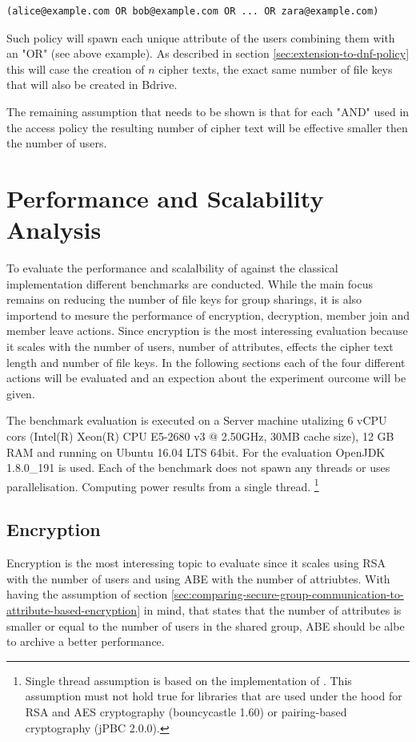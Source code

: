 \begin{center}
\begin{lstlisting}[caption={Worst case access policy. The used email address is a unique attribute per user.},captionpos=b]
(alice@example.com OR bob@example.com OR ... OR zara@example.com)
\end{lstlisting}
\end{center}

Such policy will spawn each unique attribute of the users combining them with an "OR" (see above example). As described in section \ref{sec:extension-to-dnf-policy} this will case the creation of $n$ cipher texts, the exact same number of file keys that will also be created in Bdrive. 

The remaining assumption that needs to be shown is that for each "AND" used in the access policy the resulting number of cipher text will be effective smaller then the number of users. 

\section{Performance and Scalability Analysis}

To evaluate the performance and scalalbility of \name against the classical implementation different benchmarks are conducted. While the main focus remains on reducing the number of file keys for group sharings, it is also importend to mesure the performance of encryption, decryption, member join and member leave actions. Since encryption is the most interessing evaluation because it scales with the number of users, number of attributes, effects the cipher text length and number of file keys. In the following sections each of the four different actions will be evaluated and an expection about the experiment ourcome will be given.

The benchmark evaluation is executed on a Server machine utalizing 6 vCPU cors (Intel(R) Xeon(R) CPU E5-2680 v3 @ 2.50GHz, 30MB cache size), 12 GB RAM and running on Ubuntu 16.04 LTS 64bit. For the evaluation OpenJDK 1.8.0\_191 is used. Each of the benchmark does not spawn any threads or uses parallelisation. Computing power results from a single thread. \footnote{Single thread assumption is based on the implementation of \name. This assumption must not hold true for libraries that are used under the hood for RSA and AES cryptography (bouncycastle 1.60) or pairing-based cryptography (jPBC 2.0.0).} 

\subsection{Encryption}
Encryption is the most interessing topic to evaluate since it scales using RSA with the number of users and using ABE with the number of attriubtes. With having the assumption of section \ref{sec:comparing-secure-group-communication-to-attribute-based-encryption} in mind, that states that the number of attributes is smaller or equal to the number of users in the shared group, ABE should be albe to archive a better performance. 

